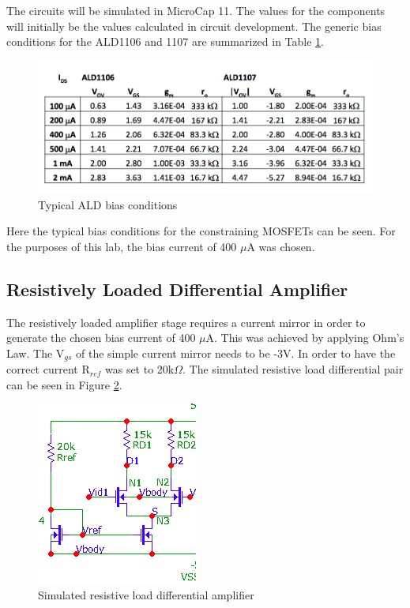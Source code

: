 The circuits will be simulated in MicroCap 11. The values for the components will initially be the values calculated in circuit development. The generic bias conditions for the ALD1106 and 1107 are summarized in Table \ref{tab:bias}. 

\begin{figure}[H]
	\begin{center}
		\includegraphics[scale=.85]{Simulations/nuribias.png}
		\caption{Typical ALD bias conditions \cite{b3}}
		\label{tab:bias}
	\end{center}
\end{figure}

Here the typical bias conditions for the constraining MOSFETs can be seen. For the purposes of this lab, the bias current of 400 $\mu$A was chosen.

\subsection{Resistively Loaded Differential Amplifier}

The resistively loaded amplifier stage requires a current mirror in order to generate the chosen bias current of 400 $\mu$A. This was achieved by applying Ohm's Law. The  V$_{gs}$ of the simple current mirror needs to be -3V. In order to  have the correct  current R$_{ref}$ was set to 20k$\Omega$. The simulated resistive load differential pair can be seen in Figure \ref{fig:ResLoadSim}.
\begin{figure}[H]
    \begin{center}
    \includegraphics[scale=.85]{Simulations/simdiff.png}
    \caption{Simulated resistive load differential amplifier}
    \label{fig:ResLoadSim}
    \end{center}
\end{figure}

